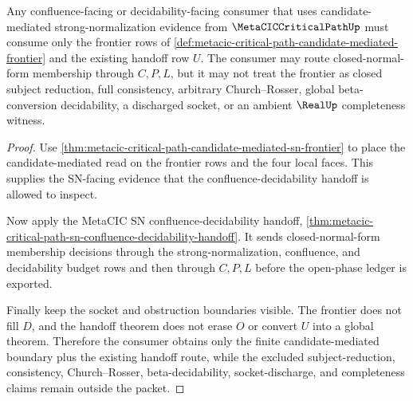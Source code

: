 \begin{theorem}\label{thm:metacic-critical-path-confluence-decidability-consumer-boundary}
Any confluence-facing or decidability-facing consumer that uses candidate-mediated strong-normalization evidence from $\MetaCICCriticalPathUp$ must consume only the frontier rows of \autoref{def:metacic-critical-path-candidate-mediated-frontier} and the existing handoff row $U$. The consumer may route closed-normal-form membership through $C,P,L$, but it may not treat the frontier as closed subject reduction, full consistency, arbitrary Church--Rosser, global beta-conversion decidability, a discharged socket, or an ambient $\RealUp$ completeness witness.
\end{theorem}
\begin{proof}
Use \autoref{thm:metacic-critical-path-candidate-mediated-sn-frontier} to place the candidate-mediated read on the frontier rows and the four local faces. This supplies the SN-facing evidence that the confluence-decidability handoff is allowed to inspect.

Now apply the MetaCIC SN confluence-decidability handoff, \autoref{thm:metacic-critical-path-sn-confluence-decidability-handoff}. It sends closed-normal-form membership decisions through the strong-normalization, confluence, and decidability budget rows and then through $C,P,L$ before the open-phase ledger is exported.

Finally keep the socket and obstruction boundaries visible. The frontier does not fill $D$, and the handoff theorem does not erase $O$ or convert $U$ into a global theorem. Therefore the consumer obtains only the finite candidate-mediated boundary plus the existing handoff route, while the excluded subject-reduction, consistency, Church--Rosser, beta-decidability, socket-discharge, and completeness claims remain outside the packet.
\end{proof}

